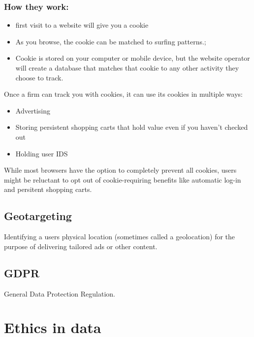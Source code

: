 \documentclass{report}
\begin{document}
\subsubsection*{How they work:}
\begin{itemize}
    \item first visit to a website will give you a cookie
    \item As you browse, the cookie can be matched to surfing patterns.;
    \item Cookie is stored on your computer or mobile device, but the website operator will create a database that matches that cookie to any other activity they choose to track.
\end{itemize}
\bigbreak \noindent
Once a firm can track you  with cookies, it can use its cookies in multiple ways:
\begin{itemize}
    \item Advertising
    \item Storing persistent shopping carts that hold value even if you haven't checked out
    \item Holding user IDS
\end{itemize}
While most browsers have the option to completely prevent all cookies, users might be reluctant to opt out of cookie-requiring benefits like automatic log-in and persitent shopping carts.
\subsection{Geotargeting}
Identifying a users physical location (sometimes called a geolocation) for the purpose of delivering tailored ads or other content.
\subsection{GDPR}
General
Data Protection Regulation. 

\section{Ethics in data}
\end{document}
